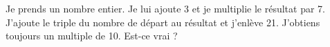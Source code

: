 
Je prends un nombre entier. Je lui ajoute 3 et je multiplie le résultat par 7. J'ajoute le triple du nombre de départ au résultat et j'enlève 21. J'obtiens toujours un multiple de 10. Est-ce vrai ?